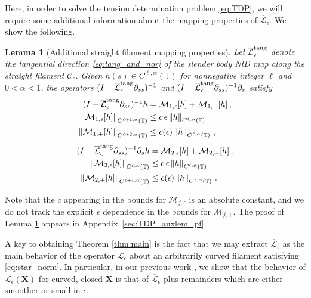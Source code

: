 \documentclass[11pt,reqno]{amsart}
\newcommand{\T}{\mathbb{T}}
\newcommand{\X}{\bm{X}}
\newcommand{\p}{\partial}
\newcommand{\norm}[1]{\left\lVert #1 \right\rVert}
\newcommand{\mc}[1]{\mathcal{#1}}
\newtheorem{lemma}[theorem]{Lemma}
\theoremstyle{definition}
\begin{document}
Here, in order to solve the tension determination problem \eqref{eq:TDP}, we will require some additional information about the mapping properties of $\overline{\mc{L}}_\epsilon$. We show the following.
%
%
\begin{lemma}[Additional straight filament mapping properties]\label{lem:TDP_auxlem}
Let $\overline{\mc{L}}_\epsilon^{\rm tang}$ denote the tangential direction \eqref{eq:tang_and_nor} of the slender body NtD map along the straight filament $\mc{C}_\epsilon$. Given $h(s)\in C^{\ell,\alpha}(\T)$ for nonnegative integer $\ell$ and $0<\alpha<1$, the operators $(I- \overline{\mc{L}}_\epsilon^{\rm tang}\p_{ss})^{-1}$ and $(I- \overline{\mc{L}}_\epsilon^{\rm tang}\p_{ss})^{-1}\p_s$ satisfy
\begin{equation}\label{eq:M1defs}
\begin{aligned}
  (I- \overline{\mc{L}}_\epsilon^{\rm tang}\p_{ss})^{-1}h &= \mc{M}_{1,\epsilon}[h] + \mc{M}_{1,+}[h]\,,\\
  \norm{\mc{M}_{1,\epsilon}[h]}_{C^{\ell+1,\alpha}(\T)} &\le c\,\epsilon\norm{h}_{C^{\ell,\alpha}(\T)} \\
  \norm{\mc{M}_{1,+}[h]}_{C^{\ell+2,\alpha}(\T)} &\le c(\epsilon)\norm{h}_{C^{\ell,\alpha}(\T)}\,,
\end{aligned}  
\end{equation}
%
\begin{equation}\label{eq:M2defs}
\begin{aligned}
  (I- \overline{\mc{L}}_\epsilon^{\rm tang}\p_{ss})^{-1}\p_sh &= \mc{M}_{2,\epsilon}[h] + \mc{M}_{2,+}[h]\,,\\
  \norm{\mc{M}_{2,\epsilon}[h]}_{C^{\ell,\alpha}(\T)} &\le c\,\epsilon\norm{h}_{C^{\ell,\alpha}(\T)} \\
  \norm{\mc{M}_{2,+}[h]}_{C^{\ell+1,\alpha}(\T)} &\le c(\epsilon)\norm{h}_{C^{\ell,\alpha}(\T)}\,.
\end{aligned}  
\end{equation}
\end{lemma}
Note that the $c$ appearing in the bounds for $\mc{M}_{j,\epsilon}$ is an absolute constant, and we do not track the explicit $\epsilon$ dependence in the bounds for $\mc{M}_{j,+}$. 
%
The proof of Lemma \ref{lem:TDP_auxlem} appears in Appendix~\ref{sec:TDP_auxlem_pf}. 



A key to obtaining Theorem \ref{thm:main} is the fact that we may extract $\overline{\mc{L}}_\epsilon$ as the main behavior of the operator $\mc{L}_\epsilon$ about an arbitrarily curved filament satisfying \eqref{eq:star_norm}. In particular, in our previous work \cite{ohm2024free}, we show that the behavior of $\mc{L}_\epsilon(\X)$ for curved, closed $\X$ is that of $\overline{\mc{L}}_\epsilon$ plus remainders which are either smoother or small in $\epsilon$. 
\end{document}
